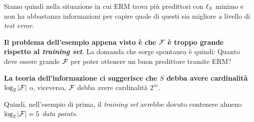 Siamo quindi nella situazione in cui ERM trova più predittori con $\ell_S$ minimo e non
ha abbastanza informazioni per capire quale di questi sia migliore a livello di
\textit{test error}.

\textbf{Il problema dell'esempio appena visto è che $\mathcal{F}$ è troppo grande rispetto al
\textit{training set}}. La domanda che sorge spontanea è quindi: Quanto deve essere 
grande $\mathcal{F}$ per poter ottenere un buon predittore tramite ERM?

\textbf{La teoria dell'informazione ci suggerisce che $S$ debba avere cardinalità
$\log_2{|\mathcal{F}|}$} o, viceversa, $\mathcal{F}$ debba avere cardinalità $2^m$.

Quindi, nell'esempio di prima, il \textit{training set} avrebbe dovuto contenere almeno
$\log_2{|\mathcal{F}|}=5$ \textit{data points}.
